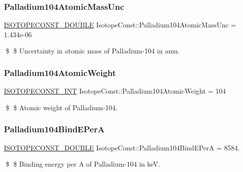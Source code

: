 \subsubsection{\texorpdfstring{Palladium104\+Atomic\+Mass\+Unc}{Palladium104AtomicMassUnc}}
{\footnotesize\ttfamily \mbox{\hyperlink{group___isotope_const-_macros_ga8f45a7272ce02c0b4c65c44636ed719a}{I\+S\+O\+T\+O\+P\+E\+C\+O\+N\+S\+T\+\_\+\+D\+O\+U\+B\+LE}} Isotope\+Const\+::\+Palladium104\+Atomic\+Mass\+Unc = 1.\+434e-\/06}

\$ \$ Uncertainty in atomic mass of Palladium-\/104 in amu. \mbox{\label{group___isotope_const-_palladium-_pd104_ga55118dd1074bcdae68e4c42f45e7f4ed}} 
\subsubsection{\texorpdfstring{Palladium104\+Atomic\+Weight}{Palladium104AtomicWeight}}
{\footnotesize\ttfamily \mbox{\hyperlink{group___isotope_const-_macros_ga5f18360b3e99483a35c32d789e62621c}{I\+S\+O\+T\+O\+P\+E\+C\+O\+N\+S\+T\+\_\+\+I\+NT}} Isotope\+Const\+::\+Palladium104\+Atomic\+Weight = 104}

\$ \$ Atomic weight of Palladium-\/104. \mbox{\label{group___isotope_const-_palladium-_pd104_ga9f39b6c2e0d30e1293ba3e402d682c4d}} 
\subsubsection{\texorpdfstring{Palladium104\+Bind\+E\+PerA}{Palladium104BindEPerA}}
{\footnotesize\ttfamily \mbox{\hyperlink{group___isotope_const-_macros_ga8f45a7272ce02c0b4c65c44636ed719a}{I\+S\+O\+T\+O\+P\+E\+C\+O\+N\+S\+T\+\_\+\+D\+O\+U\+B\+LE}} Isotope\+Const\+::\+Palladium104\+Bind\+E\+PerA = 8584.}

\$ \$ Binding energy per A of Palladium-\/104 in keV. \mbox{\label{group___isotope_const-_palladium-_pd104_gaedc6d826dd034c8abe9d4f9fe6909f16}} 
